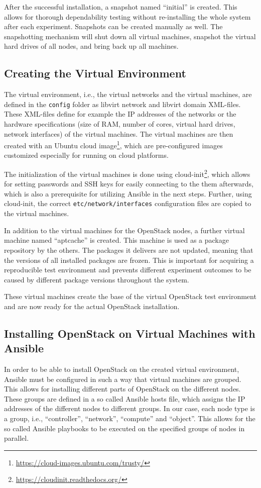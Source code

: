 \documentclass[conference]{IEEEtran}
\begin{document}
After the successful installation, a snapshot named ``initial'' is created. This allows for thorough dependability testing without re-installing the whole system after each experiment. Snapshots can be created manually as well. The snapshotting mechanism will shut down all virtual machines, snapshot the virtual hard drives of all nodes, and bring back up all machines.

\subsection{Creating the Virtual Environment}
\label{subsec:createve}
The virtual environment, i.e., the virtual networks and the virtual machines, are defined in the \verb|config| folder as libvirt network and libvirt domain XML-files. These XML-files define for example the IP addresses of the networks or the hardware specifications (size of RAM, number of cores, virtual hard drives, network interfaces) of the virtual machines. The virtual machines are then created with an Ubuntu cloud image\footnote{\url{https://cloud-images.ubuntu.com/trusty/}}, which are pre-configured images customized especially for running on cloud platforms. 

The initialization of the virtual machines is done using cloud-init\footnote{\url{https://cloudinit.readthedocs.org/}}, which allows for setting passwords and SSH keys for easily connecting to the them afterwards, which is also a prerequisite for utilizing Ansible in the next steps. Further, using cloud-init, the correct \verb|etc/network/interfaces| configuration files are copied to the virtual machines. 

In addition to the virtual machines for the OpenStack nodes, a further virtual machine named ``aptcache'' is created. This machine is used as a package repository by the others. The packages it delivers are not updated, meaning that the versions of all installed packages are frozen. This is important for acquiring a reproducible test environment and prevents different experiment outcomes to be caused by different package versions throughout the system.

These virtual machines create the base of the virtual OpenStack test environment and are now ready for the actual OpenStack installation.

\subsection{Installing OpenStack on Virtual Machines with Ansible}
In order to be able to install OpenStack on the created virtual environment, Ansible must be configured in such a way that virtual machines are grouped. This allows for installing different parts of OpenStack on the different nodes. These groups are defined in a so called Ansible hosts file, which assigns the IP addresses of the different nodes to different groups. In our case, each node type is a group, i.e., ``controller'', ``network'', ``compute'' and ``object''. This allows for the so called Ansible playbooks to be executed on the specified groups of nodes in parallel. 
\end{document}
